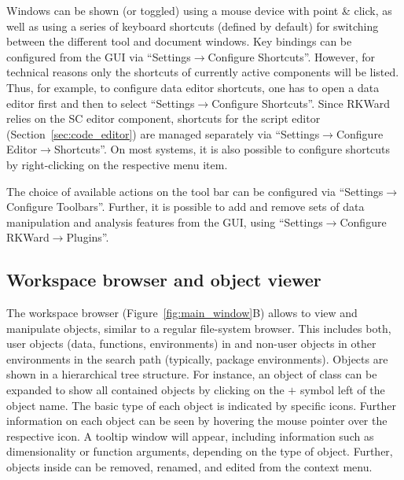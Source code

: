 Windows can be shown (or toggled) using a mouse device with point \&
click, as well as using a series of keyboard shortcuts (defined by
default) for switching between the different tool and document windows.
Key bindings can be configured from the GUI via ``Settings$\rightarrow$Configure Shortcuts''. 
However, for technical reasons only the shortcuts of currently active components 
will be listed. Thus, for example, to
configure data editor shortcuts, one has to open a data editor first and
then to select ``Settings$\rightarrow$Configure Shortcuts''. Since RKWard relies on the 
 SC editor component,
shortcuts for the script editor (Section~\ref{sec:code_editor}) are managed separately via 
``Settings$\rightarrow$Configure Editor$\rightarrow$Shortcuts''. On most systems, it is also
possible to configure shortcuts by right-clicking on the respective
menu item.

The choice of available actions on the tool bar can be
configured via ``Settings$\rightarrow$Configure Toolbars''. Further, it is possible to add and remove sets
of data manipulation and analysis features from the GUI, using
``Settings$\rightarrow$Configure RKWard$\rightarrow$Plugins''.

\subsection{Workspace browser and object viewer}
\label{sec:workspace_browser_object_viewer}

The workspace browser (Figure~\ref{fig:main_window}B) allows to view
and manipulate  objects, similar
to a regular file-system browser. This includes both, user objects
(data, functions, environments) in  and non-user objects in other environments in the
 search path (typically,
 package environments). Objects are shown
in a hierarchical tree structure. For instance, an object of class
 can be expanded to show all contained objects 
by clicking on the $+$ symbol left of the object name.
The basic type of each object is indicated by specific icons. Further
information on each object can be seen by hovering the mouse
pointer over the respective icon. A tooltip window will appear,
including information such as dimensionality or function arguments,
depending on the type of object. Further, objects inside  can be
removed, renamed, and edited from the context menu.

